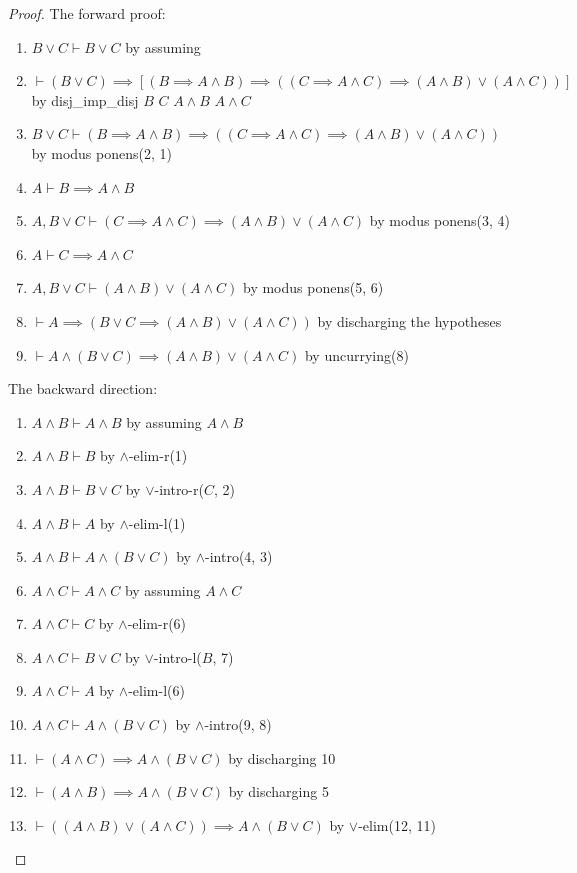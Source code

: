 \begin{proof}
The forward proof:
\begin{enumerate}
\item $B\lor C\vdash B\lor C$ by assuming
\item $\vdash (B\lor C)\implies[(B\implies A\land B)\implies((C\implies A\land C)\implies(A\land B)\lor(A\land C))]$
  by {\Tt{}disj{\_}imp{\_}disj\nwendquote} $B$ $C$ $A\land B$ $A\land C$
\item $B\lor C\vdash(B\implies A\land B)\implies((C\implies A\land C)\implies(A\land B)\lor(A\land C))$
  by modus ponens(2, 1)%
\item $A\vdash B\implies A\land B$%
\item $A, B\lor C\vdash(C\implies A\land C)\implies(A\land B)\lor(A\land C)$
  by modus ponens(3, 4)%
\item $A\vdash C\implies A\land C$%
\item $A, B\lor C\vdash(A\land B)\lor(A\land C)$
  by modus ponens(5, 6)%
\item $\vdash A\implies(B\lor C\implies(A\land B)\lor(A\land C))$
  by discharging the hypotheses%
\item $\vdash A\land(B\lor C)\implies(A\land B)\lor(A\land C)$
  by uncurrying(8)%
\end{enumerate}
The backward direction:
\begin{enumerate}
\item $A\land B\vdash A\land B$ by assuming $A\land B$%
\item $A\land B\vdash B$ by $\land$-elim-r(1)%
\item $A\land B\vdash B\lor C$ by $\lor$-intro-r($C$, 2)%
\item $A\land B\vdash A$ by $\land$-elim-l(1)%
\item $A\land B\vdash A\land(B\lor C)$ by $\land$-intro(4, 3)%
\item $A\land C\vdash A\land C$ by assuming $A\land C$%
\item $A\land C\vdash C$ by $\land$-elim-r(6)%
\item $A\land C\vdash B\lor C$ by $\lor$-intro-l($B$, 7)%
\item $A\land C\vdash A$ by $\land$-elim-l(6)%
\item $A\land C\vdash A\land(B\lor C)$ by $\land$-intro(9, 8)%
\item $\vdash(A\land C)\implies A\land(B\lor C)$ by discharging 10
\item $\vdash(A\land B)\implies A\land(B\lor C)$ by discharging 5
\item $\vdash((A\land B)\lor(A\land C))\implies A\land(B\lor C)$ by
  $\lor$-elim(12, 11)
\qedhere
\end{enumerate}
\end{proof}

